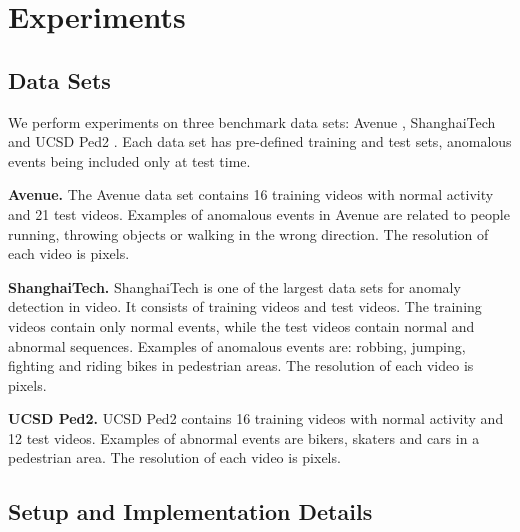 \documentclass[final]{cvpr}
\begin{document}
\vspace*{-0.1cm}
\section{Experiments}
\label{sec_experiments}
\vspace{-0.1cm}
 
\subsection{Data Sets}
\vspace*{-0.1cm}

We perform experiments on three benchmark data sets: Avenue \cite{Lu-ICCV-2013}, ShanghaiTech \cite{Luo-ICCV-2017} and UCSD Ped2 \cite{Mahadevan-CVPR-2010}. Each data set has pre-defined training and test sets, anomalous events being included only at test time. 

\noindent
{\bf Avenue.} The Avenue \cite{Lu-ICCV-2013} data set contains 16 training videos with normal activity and 21 test videos. Examples of anomalous events in Avenue are related to people running, throwing objects or walking in the wrong direction. The resolution of each video is  pixels. 

\noindent
{\bf ShanghaiTech.} ShanghaiTech \cite{Luo-ICCV-2017} is one of the largest data sets for anomaly detection in video. It consists of  training videos and  test videos. The training videos contain only normal events, while the test videos contain normal and abnormal sequences. Examples of anomalous events are: robbing, jumping, fighting and riding bikes in pedestrian areas. The resolution of each video is  pixels. 

\noindent
{\bf UCSD Ped2.} UCSD Ped2 \cite{Mahadevan-CVPR-2010} contains 16 training videos with normal activity and 12 test videos. Examples of abnormal events are bikers, skaters and cars in a pedestrian area. The resolution of each video is  pixels. 

\vspace*{-0.1cm}
\subsection{Setup and Implementation Details}
\vspace*{-0.1cm}
\end{document}
